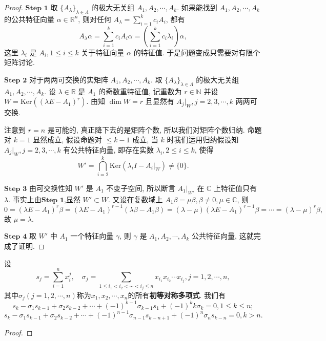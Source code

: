 \documentclass[../../main.tex]{subfiles}
\begin{document}
\begin{proof} 
$\mathbf{Step}\,\,\mathbf{1}$ 取 \( \{A_\lambda\}_{\lambda \in \Lambda} \) 的极大无关组 \( A_1, A_2, \cdots, A_k \). 如果能找到 \( A_1, A_2, \cdots, A_k \) 的公共特征向量 \( \alpha \in \mathbb{R}^n \), 则对任何 \( A_\lambda = \sum_{i=1}^k c_i A_i \), 都有
\[
A_\lambda \alpha = \sum_{i=1}^k c_i A_i \alpha = \left( \sum_{i=1}^k c_i \lambda_i \right) \alpha,
\]
这里 \( \lambda_i \) 是 \( A_i, 1 \leqslant i \leqslant k \) 关于特征向量 \( \alpha \) 的特征值. 于是问题变成只需要对有限个矩阵讨论.

$\mathbf{Step}\,\,\mathbf{2}$ 对于两两可交换的实矩阵 \( A_1, A_2, \cdots, A_k \). 取 \( \{A_\lambda\}_{\lambda \in \Lambda} \) 的极大无关组 \( A_1, A_2, \cdots, A_k \). 设 \( \lambda \in \mathbb{R} \) 是 \( A_1 \) 的奇数重特征值, 记重数为 \( r \in \mathbb{N} \) 并设 \( W = \mathrm{Ker} \left( (\lambda E - A_1)^r \right) \). 由知 \( \dim W = r \) 且显然有 \( A_j|_W, j = 2, 3, \cdots, k \) 两两可交换.

注意到 \( r = n \) 是可能的, 真正降下去的是矩阵个数, 所以我们对矩阵个数归纳. 命题对 \( k = 1 \) 显然成立, 假设命题对 \( \leqslant k - 1 \) 成立, 当 \( k \) 时我们运用归纳假设知 \( A_j|_W, j = 2, 3, \cdots, k \) 有公共特征向量, 即存在实数 \( \lambda_i, 2 \leqslant i \leqslant k \), 使得
\[
W' = \bigcap_{i=2}^k \mathrm{Ker} \left( \lambda_i I - A_i|_W \right) \neq \{0\}.
\]

$\mathbf{Step}\,\,\mathbf{3}$ 由可交换性知 \( W' \) 是 \( A_1 \) 不变子空间, 所以断言 \( A_1|_{W'} \) 在 \( \mathbb{C} \) 上特征值只有 \( \lambda \). 事实上由$\mathbf{Step}\,\,\mathbf{1}$,显然 \( W' \subset W \). 又设在复数域上 \( A_1 \beta = \mu \beta, \beta \neq 0, \mu \in \mathbb{C} \), 则
\[
0 = (\lambda E - A_1)^r \beta = (\lambda E - A_1)^{r - 1} (\lambda \beta - A_1 \beta) = (\lambda - \mu)(\lambda E - A_1)^{r - 1} \beta = \cdots = (\lambda - \mu)^r \beta,
\]
故 \( \mu = \lambda \).

$\mathbf{Step}\,\,\mathbf{4}$ 取 \( W' \) 中 \( A_1 \) 一个特征向量 \( \gamma \), 则 \( \gamma \) 是 \( A_1, A_2, \cdots, A_k \) 公共特征向量, 这就完成了证明.

\end{proof}

\begin{theorem}[Netwon公式]\label{theorem:Netwon公式}
设
\[
s_j = \sum_{i=1}^n x_i^j, \quad \sigma_j = \sum_{1 \leqslant i_1 < i_2 < \cdots < i_j \leqslant n} x_{i_1}x_{i_2} \cdots x_{i_j}, j = 1, 2, \cdots, n,
\]
其中$\sigma_j(j=1,2,\cdots,n)$称为$x_1,x_2,\cdots,x_n$的所有\textbf{初等对称多项式}.
我们有
\[
s_k - \sigma_1 s_{k - 1} + \sigma_2 s_{k - 2} + \cdots + (-1)^{k - 1} \sigma_{k - 1} s_1 + (-1)^k k \sigma_k = 0, 1 \leqslant k \leqslant n;
\]
\[
s_k - \sigma_1 s_{k - 1} + \sigma_2 s_{k - 2} + \cdots + (-1)^{n - 1} \sigma_{n - 1} s_{k - n + 1} + (-1)^n \sigma_n s_{k - n} = 0, k > n.
\]
\end{theorem}
\begin{proof}


\end{proof}
\end{document}

